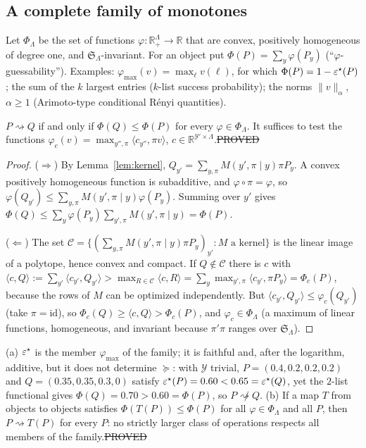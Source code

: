 \subsection{A complete family of monotones}\label{sec:complete}

Let $\Phi_\Lambda$ be the set of functions $\varphi:\mathbb R_+^\Lambda\to\mathbb R$ that are convex, positively homogeneous of degree one, and $\mathfrak S_\Lambda$-invariant. For an object put $\Phi(P)=\sum_y\varphi(P_y)$
(``$\varphi$-guessability''). Examples: $\varphi_{\max}(v)=\max_\ell v(\ell)$, for which $\Phi(P)=1-\varepsilon^{\star}(P)$; the sum of the $k$ largest entries ($k$-list success probability); the norms $\|v\|_\alpha$, $\alpha\ge1$ (Arimoto-type conditional R\'enyi quantities).

\begin{theorem}\label{thm:complete}
$P\rightsquigarrow Q$ if and only if $\Phi(Q)\le\Phi(P)$ for every $\varphi\in\Phi_\Lambda$. It suffices to test the functions $\varphi_c(v)=\max_{y'',\pi}\langle c_{y''},\pi v\rangle$, $c\in\mathbb R^{\mathcal Y'\times\Lambda}$.\hfill\st{PROVED}
\end{theorem}
\begin{proof}
($\Rightarrow$) By Lemma~\ref{lem:kernel}, $Q_{y'}=\sum_{y,\pi}M(y',\pi\mid y)\pi P_y$. A convex positively homogeneous function is subadditive, and $\varphi\circ\pi=\varphi$, so
$\varphi(Q_{y'})\le\sum_{y,\pi}M(y',\pi\mid y)\varphi(P_y)$. Summing over $y'$ gives $\Phi(Q)\le\sum_y\varphi(P_y)\sum_{y',\pi}M(y',\pi\mid y)=\Phi(P)$.

($\Leftarrow$) The set $\mathcal C=\{(\sum_{y,\pi}M(y',\pi\mid y)\pi P_y)_{y'}:M\text{ a kernel}\}$ is the linear image of a polytope, hence convex and compact. If $Q\notin\mathcal C$ there is $c$ with
$\langle c,Q\rangle:=\sum_{y'}\langle c_{y'},Q_{y'}\rangle>\max_{R\in\mathcal C}\langle c,R\rangle=\sum_y\max_{y',\pi}\langle c_{y'},\pi P_y\rangle=\Phi_c(P)$, because the rows of $M$ can be optimized independently.
But $\langle c_{y'},Q_{y'}\rangle\le\varphi_c(Q_{y'})$ (take $\pi=\mathrm{id}$), so $\Phi_c(Q)\ge\langle c,Q\rangle>\Phi_c(P)$, and $\varphi_c\in\Phi_\Lambda$ (a maximum of linear functions, homogeneous, and invariant because $\pi'\pi$ ranges over $\mathfrak S_\Lambda$).
\end{proof}

\begin{corollary}\label{cor:incomplete}
(a) $\varepsilon^{\star}$ is the member $\varphi_{\max}$ of the family; it is faithful and, after the logarithm, additive, but it does not determine $\succeq$: with $\mathcal Y$ trivial,
$P=(0.4,0.2,0.2,0.2)$ and $Q=(0.35,0.35,0.3,0)$ satisfy $\varepsilon^{\star}(P)=0.60<0.65=\varepsilon^{\star}(Q)$, yet the $2$-list functional gives $\Phi(Q)=0.70>0.60=\Phi(P)$, so $P\not\rightsquigarrow Q$.
(b) If a map $T$ from objects to objects satisfies $\Phi(T(P))\le\Phi(P)$ for all $\varphi\in\Phi_\Lambda$ and all $P$, then $P\rightsquigarrow T(P)$ for every $P$: no strictly larger class of operations respects all members of the family.\hfill\st{PROVED}
\end{corollary}

